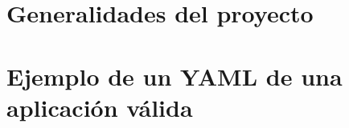 \documentclass[12pt, oneside]{book}
\begin{document}
    
    

    

    

    \renewcommand{\contentsname}{\normalsize Contenido}
    \tableofcontents
    \newpage

    \renewcommand{\listfigurename}{\normalsize Lista de figuras}
    \listoffigures
    
    \renewcommand{\listtablename}{\normalsize Lista de tablas}    
    \listoftables
    \mainmatter


    

    \chapter{Generalidades del proyecto}
    
    

    

    

    

    
    
    

    \newpage
    
    
    
    \appendix
    \newpage
    \chapter{Ejemplo de un YAML de una aplicación válida}\label{appendix:example}
    

\end{document}
